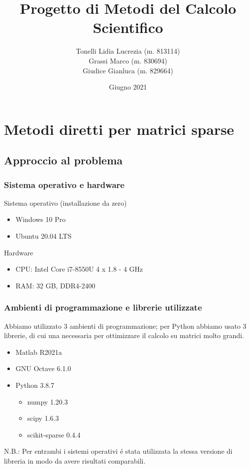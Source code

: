 \documentclass{beamer}
\title{Progetto di Metodi del Calcolo Scientifico} %
\author{Tonelli Lidia Lucrezia (m. 813114)\\
Grassi Marco (m. 830694)\\
Giudice Gianluca (m. 829664)
} %
\institute[University of Milano Bicocca] %
{
University of Milano Bicocca \\ %
\medskip
}
\date{Giugno 2021} %
\begin{document}
\begin{frame}
\titlepage %
\end{frame}


\section{Metodi diretti per matrici sparse}

\subsection{Approccio al problema}

\begin{frame}
	
	\frametitle{Sistema operativo e hardware }
	Sistema operativo (installazione da zero)
	\begin{itemize}
		\item Windows 10 Pro
		\item Ubuntu 20.04 LTS
	\end{itemize}

	Hardware
	\begin{itemize}
		\item CPU: Intel Core i7-8550U 4 x 1.8 - 4 GHz
		\item RAM: 32 GB, DDR4-2400
	\end{itemize}
\end{frame}


\begin{frame}
	
	\frametitle{Ambienti di programmazione e librerie utilizzate}
	Abbiamo utilizzato 3 ambienti di programmazione; per Python abbiamo usato 3 librerie, di cui una necessaria per ottimizzare il calcolo su matrici molto grandi.
	\begin{itemize}
		\item Matlab  R2021a
		\item GNU Octave 6.1.0
		\item Python 3.8.7
		\begin{itemize}
			\item numpy 1.20.3
			\item scipy 1.6.3
			\item scikit-sparse 0.4.4
		\end{itemize}
	\end{itemize}
	N.B.: Per entrambi i sistemi operativi \'e stata utilizzata la stessa versione di libreria in modo da avere risultati comparabili.
\end{frame}
\end{document}
